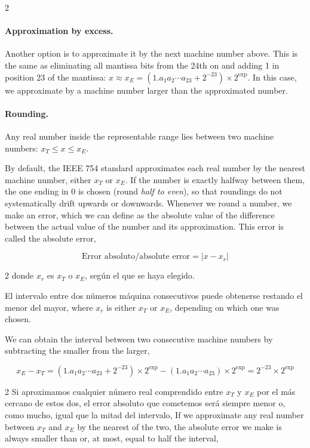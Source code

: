 \begin{paracol}{2}
\paragraph{Approximation by excess.} Another option is to approximate it by the next machine number above. This is the same as eliminating all mantissa bits from the 24th on and adding 1 in position 23 of the mantissa: $x\approx x_E=  (1.a_1a_2\cdots a_{23}+2^{-23})\times2^{\text{exp}}$. In this case, we approximate by a machine number larger than the approximated number.

\paragraph{Rounding.} Any real number inside the representable range lies between two machine numbers: $x_T\leq x\leq x_E$.

By default, the IEEE 754 standard approximates each real number by the nearest machine number, either $x_T$ or $x_E$. If the number is exactly halfway between them, the one ending in 0 is chosen (round \emph{half to even}), so that roundings do not systematically drift upwards or downwards.
Whenever we round a number, we make an error, which we can define as the absolute value of the difference between the actual value of the number and its approximation. This error is called the absolute error,
\end{paracol}
\begin{equation*}
\text{Error absoluto/absolute error}=\vert x-x_r\vert
\end{equation*}

\begin{paracol}{2}
donde $x_r$ es $x_T$ o $x_E$, según el que se haya elegido.

El intervalo entre dos números máquina consecutivos puede obtenerse restando el menor del mayor,
\switchcolumn
where $x_r$ is either $x_T$ or $x_E$, depending on which one was chosen.

We can obtain the interval between two consecutive machine numbers by subtracting the smaller from the larger,
\end{paracol}

\begin{equation*}
x_E-x_T= (1.a_1a_2\cdots a_{23}+2^{-23})\times2^\text{exp}- (1.a_1a_2\cdots a_{23})\times2^{\text{exp}}=2^{-23}\times 2^\text{exp}
\end{equation*}

\begin{paracol}{2}
Si aproximamos cualquier número real comprendido entre $x_T$ y $x_E$ por el más cercano de estos dos, el error absoluto que cometemos será siempre menor o, como mucho, igual que la mitad del intervalo,
\switchcolumn
If we approximate any real number between $x_T$ and $x_E$ by the nearest of the two, the absolute error we make is always smaller than or, at most, equal to half the interval,
\end{paracol}

